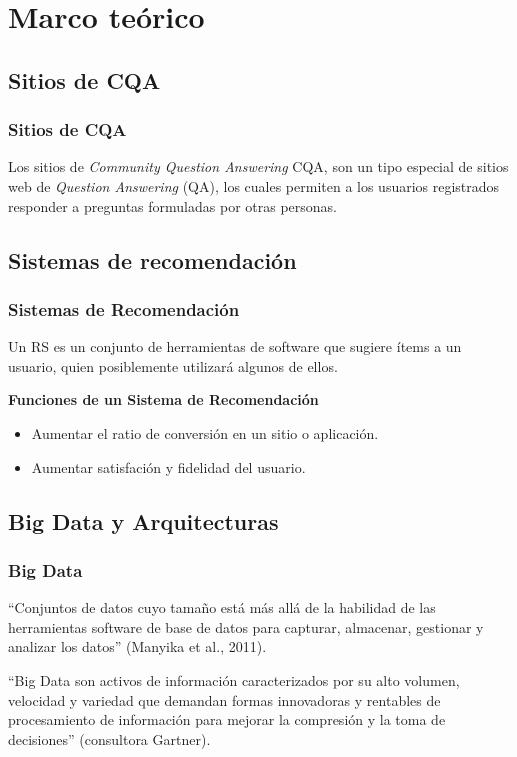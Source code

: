 \section{Marco teórico}
\subsection{Sitios de CQA}
\begin{frame}
	\frametitle{Sitios de CQA}
	\begin{tcolorbox}[colback=blue!5,colframe=blue!40!black,title=Sitios de Community Question Answering]
		Los sitios de \textit{Community Question Answering} CQA, son un tipo especial de sitios web de \textit{Question Answering} (QA), los cuales permiten a los usuarios registrados responder a preguntas formuladas por otras personas.
	\end{tcolorbox}
\end{frame}

\subsection{Sistemas de recomendación}
\begin{frame}
	\frametitle{Sistemas de Recomendación}
	\begin{tcolorbox}[colback=blue!5,colframe=blue!40!black,title=Sistemas de Recomendación]
		Un RS es un conjunto de herramientas de software que sugiere ítems a un usuario, quien posiblemente utilizará algunos de ellos.
	\end{tcolorbox}

	\bigskip

	\textbf{Funciones de un Sistema de Recomendación}
	\begin{itemize} [<*>]
		\item Aumentar el ratio de conversión en un sitio o aplicación.
		\item Aumentar satisfación y fidelidad del usuario.
	\end{itemize}
\end{frame}

\subsection{Big Data y Arquitecturas}
\begin{frame}[allowframebreaks]
	\frametitle{Big Data}
	\begin{tcolorbox}[colback=blue!5,colframe=blue!40!black,title=Big Data]
		``Conjuntos de datos cuyo tamaño está más allá de la habilidad de las herramientas software de base de datos para capturar, almacenar, gestionar y analizar los datos'' (Manyika et al., 2011).

		\bigskip

		``Big Data son activos de información caracterizados por su alto volumen, velocidad y variedad que demandan formas innovadoras y rentables de procesamiento de información para mejorar la compresión y la toma de decisiones'' (consultora Gartner).
	\end{tcolorbox}
\end{frame}

